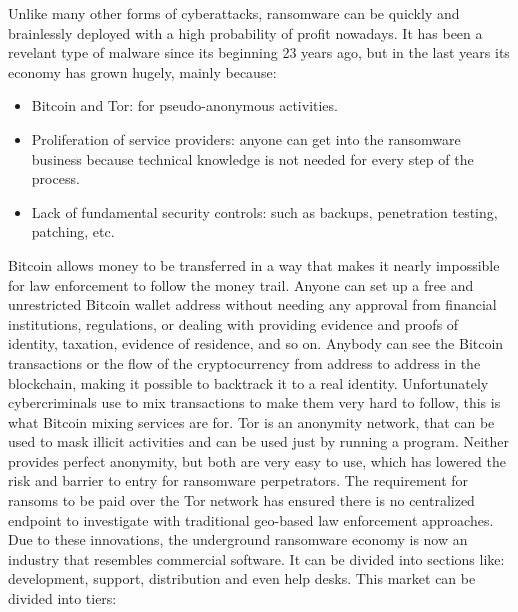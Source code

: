 \linej
Unlike many other forms of cyberattacks, ransomware can be quickly and brainlessly deployed with a high probability of profit nowadays.
It has been a revelant type of malware since its beginning 23 years ago, but in the last years its economy has grown hugely, mainly because\cite{ransomware_digital_extortion}\cite{ransomware_economy}:
\begin{itemize}
	\item Bitcoin and Tor: for pseudo-anonymous activities.
	\item Proliferation of service providers: anyone can get into the ransomware business because technical knowledge is not needed for every step of the process.
	\item Lack of fundamental security controls: such as backups, penetration testing, patching, etc.
\end{itemize}
\linej
Bitcoin allows money to be transferred in a way that makes it nearly impossible for law enforcement to follow the money trail.
Anyone can set up a free and unrestricted Bitcoin wallet address without needing any approval from financial institutions, regulations, or dealing with providing evidence and proofs of identity, taxation, evidence of residence, and so on.
Anybody can see the Bitcoin transactions or the flow of the cryptocurrency from address to address in the blockchain, making it possible to backtrack it to a real identity.
Unfortunately cybercriminals use to mix transactions to make them very hard to follow, this is what Bitcoin mixing services are for.
\linej
Tor is an anonymity network, that can be used to mask illicit activities and can be used just by running a program.
\linej
Neither provides perfect anonymity, but both are very easy to use, which has lowered the risk and barrier to entry for ransomware perpetrators.
The requirement for ransoms to be paid over the Tor network has ensured there is no centralized endpoint to investigate with traditional geo-based law enforcement approaches\cite{ransomware_digital_extortion}.
\linej
\linej
Due to these innovations, the underground ransomware economy is now an industry that resembles commercial software. It can be divided into sections like: development, support, distribution and even help desks. This market can be divided into tiers\cite{ransomware_economy}:
